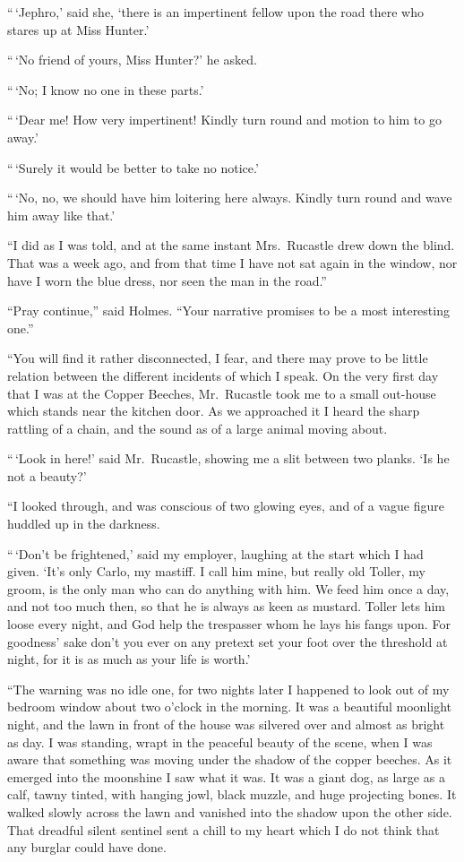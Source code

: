 “\,‘Jephro,’ said she, ‘there is an impertinent fellow upon the
road there who stares up at Miss Hunter.’

“\,‘No friend of yours, Miss Hunter?’ he asked.

“\,‘No; I know no one in these parts.’

“\,‘Dear me! How very impertinent! Kindly turn round
and motion to him to go away.’

“\,‘Surely it would be better to take no notice.’

“\,‘No, no, we should have him loitering here always. Kindly
turn round and wave him away like that.’

“I did as I was told, and at the same instant Mrs.~Rucastle
drew down the blind. That was a week ago, and from that
time I have not sat again in the window, nor have I worn the
blue dress, nor seen the man in the road.”

“Pray continue,” said Holmes. “Your narrative promises
to be a most interesting one.”

“You will find it rather disconnected, I fear, and there may
prove to be little relation between the different incidents of
which I speak. On the very first day that I was at the Copper
Beeches, Mr.~Rucastle took me to a small out-house which
stands near the kitchen door. As we approached it I heard
the sharp rattling of a chain, and the sound as of a large
animal moving about.

“\,‘Look in here!’ said Mr.~Rucastle, showing me a slit between
two planks. ‘Is he not a beauty?’

“I looked through, and was conscious of two glowing eyes,
and of a vague figure huddled up in the darkness.

“\,‘Don’t be frightened,’ said my employer, laughing at the
start which I had given. ‘It’s only Carlo, my mastiff. I call
him mine, but really old Toller, my groom, is the only man
who can do anything with him. We feed him once a day, and
not too much then, so that he is always as keen as mustard.
Toller lets him loose every night, and God help the trespasser
whom he lays his fangs upon. For goodness’ sake don’t you
ever on any pretext set your foot over the threshold at night,
for it is as much as your life is worth.’

“The warning was no idle one, for two nights later I happened
to look out of my bedroom window about two o’clock
in the morning. It was a beautiful moonlight night, and the
lawn in front of the house was silvered over and almost as
bright as day. I was standing, wrapt in the peaceful beauty
of the scene, when I was aware that something was moving
under the shadow of the copper beeches. As it emerged into
the moonshine I saw what it was. It was a giant dog, as
large as a calf, tawny tinted, with hanging jowl, black muzzle,
and huge projecting bones. It walked slowly across the lawn
and vanished into the shadow upon the other side. That
dreadful silent sentinel sent a chill to my heart which I do
not think that any burglar could have done.

